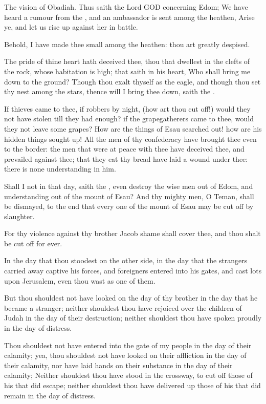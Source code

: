 \Chapter
\Verse The vision of Obadiah. Thus saith the Lord GOD concerning Edom; We have heard a rumour from the \LORD, and an ambassador is sent among the heathen, Arise ye, and let us rise up against her in battle.

\Verse Behold, I have made thee small among the heathen: thou art greatly despised.

\Verse The pride of thine heart hath deceived thee, thou that dwellest in the clefts of the rock, whose habitation is high; that saith in his heart, Who shall bring me down to the ground?  \Verse Though thou exalt thyself as the eagle, and though thou set thy nest among the stars, thence will I bring thee down, saith the \LORD.

\Verse If thieves came to thee, if robbers by night, (how art thou cut off!)  would they not have stolen till they had enough? if the grapegatherers came to thee, would they not leave some grapes?  \Verse How are the things of Esau searched out! how are his hidden things sought up!  \Verse All the men of thy confederacy have brought thee even to the border: the men that were at peace with thee have deceived thee, and prevailed against thee; that they eat thy bread have laid a wound under thee: there is none understanding in him.

\Verse Shall I not in that day, saith the \LORD, even destroy the wise men out of Edom, and understanding out of the mount of Esau?  \Verse And thy mighty men, O Teman, shall be dismayed, to the end that every one of the mount of Esau may be cut off by slaughter.

\Verse For thy violence against thy brother Jacob shame shall cover thee, and thou shalt be cut off for ever.

\Verse In the day that thou stoodest on the other side, in the day that the strangers carried away captive his forces, and foreigners entered into his gates, and cast lots upon Jerusalem, even thou wast as one of them.

\Verse But thou shouldest not have looked on the day of thy brother in the day that he became a stranger; neither shouldest thou have rejoiced over the children of Judah in the day of their destruction; neither shouldest thou have spoken proudly in the day of distress.

\Verse Thou shouldest not have entered into the gate of my people in the day of their calamity; yea, thou shouldest not have looked on their affliction in the day of their calamity, nor have laid hands on their substance in the day of their calamity; \Verse Neither shouldest thou have stood in the crossway, to cut off those of his that did escape; neither shouldest thou have delivered up those of his that did remain in the day of distress.

